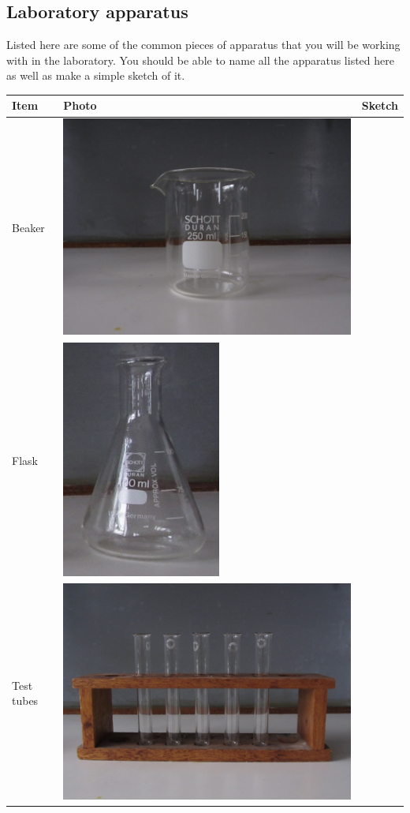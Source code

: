 \subsection*{Laboratory apparatus}
Listed here are some of the common pieces of apparatus that you will be working with in the laboratory. You should be able to name all the apparatus listed here as well as make a simple sketch of it. 
\begin{table}[H]
 \begin{center}
  \begin{tabular}{|l|m{3cm}|m{3cm}|}\hline
   \textbf{Item} & \textbf{Photo} & \textbf{Sketch} \\ \hline
Beaker & \includegraphics[width=.2\textwidth]{photos/beaker.jpg} & \scalebox{.4}{\begin{pspicture}(0,0)(5,5) \pstTubeEssais[glassType=becher] \end{pspicture}} \\ \hline
Flask & \includegraphics[width=.05\textheight]{photos/flask.JPG} & \scalebox{.4}{\begin{pspicture}(0,0)(5,5) \pstTubeEssais[glassType=erlen] \end{pspicture}} \\ \hline
Test tubes & \includegraphics[width=.2\textwidth]{photos/testtubes.jpg} & \scalebox{.4}{\begin{pspicture}(0,0)(5,5) \pstTubeEssais \end{pspicture}} \\ \hline

\end{tabular}
\end{center}
\end{table}
